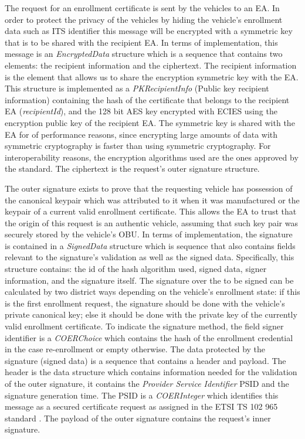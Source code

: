 The request for an enrollment certificate is sent by the vehicles to an EA. In order to protect the privacy of the vehicles by hiding the vehicle's enrollment data such as ITS identifier this message will be encrypted with a symmetric key that is to be shared with the recipient EA. In terms of implementation, this message is an \textit{EncryptedData} structure which is a sequence that contains two elements: the recipient information and the ciphertext. The recipient information is the element that allows us to share the encryption symmetric key with the EA. This structure is implemented as a \textit{PKRecipientInfo} (Public key recipient information) containing the hash of the certificate that belongs to the recipient EA (\textit{recipientId}), and the 128 bit AES key encrypted with ECIES using the encryption public key of the recipient EA. The symmetric key is shared with the EA for of performance reasons, since encrypting large amounts of data with symmetric cryptography is faster than using symmetric cryptography. For interoperability reasons, the encryption algorithms used are the ones approved by the standard. The ciphertext is the request's outer signature structure.

The outer signature exists to prove that the requesting vehicle has possession of the canonical keypair which was attributed to it when it was manufactured or the keypair of a current valid enrollment certificate. This allows the EA to trust that the origin of this request is an authentic vehicle, assuming that such key pair was securely stored by the vehicle's OBU. In terms of implementation, the signature is contained in a \textit{SignedData} structure which is sequence that also contains fields relevant to the signature's validation as well as the signed data. Specifically, this structure contains: the id of the hash algorithm used, signed data, signer information, and the signature itself. The signature over the to be signed can be calculated by two district ways depending on the vehicle's enrollment state: if this is the first enrollment request, the signature should be done with the vehicle's private canonical key; else it should be done with the private key of the currently valid enrollment certificate. To indicate the signature method, the field signer identifier is a \textit{COERChoice} which contains the hash of the enrollment credential in the case re-enrollment or empty otherwise. The data protected by the signature (signed data) is a sequence that contains a header and payload. The header is the data structure which contains information needed for the validation of the outer signature, it contains the \textit{Provider Service Identifier} PSID and the signature generation time. The PSID is a \textit{COERInteger} which identifies this message as a secured certificate request as assigned in the ETSI TS 102 965 standard \cite{etsi_PSID}. The payload of the outer signature contains the request's inner signature.

